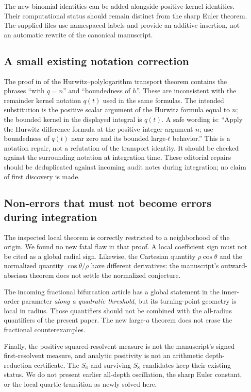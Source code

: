 \documentclass[11pt,letterpaper]{article}
\numberwithin{equation}{section}
\theoremstyle{definition}
\theoremstyle{remark}
\begin{document}
The new binomial identities can be added alongside positive-kernel
identities. Their computational status should remain distinct from
the sharp Euler theorem. The supplied  files use
namespaced labels and provide an additive insertion, not an automatic
rewrite of the canonical manuscript.

\subsection{A small existing notation correction}
The proof in  of the
Hurwitz--polylogarithm transport theorem contains the phrases ``with $q=n$'' and
``boundedness of $h$''. These are inconsistent with the remainder kernel
notation $q(t)$ used in the same formulas. The intended substitution
is the positive scalar argument of the Hurwitz formula equal to $n$;
the bounded kernel in the displayed integral is $q(t)$.
A safe wording is: ``Apply the Hurwitz difference formula at the
positive integer argument $n$; use boundedness of $q(t)$ near zero and
its bounded large-$t$ behavior.'' This is a notation repair, not a
refutation of the transport identity. It should be checked against the
surrounding notation at integration time. These editorial repairs should be deduplicated against incoming audit
notes during integration; no claim of first discovery is made.

\subsection{Non-errors that must not become errors during integration}
The inspected local theorem is correctly restricted to a neighborhood
of the origin. We found no new fatal flaw in that proof. A local
coefficient sign must not be cited as a global radial sign. Likewise,
the Cartesian quantity $\rho\cos\theta$ and the normalized quantity
$\cos\theta/\rho$ have different derivatives: the manuscript's
outward-abscissa theorem does not settle the normalized conjecture.

The incoming fractional bifurcation article has a global statement in
the inner-order parameter \emph{along a quadratic threshold}, but its
turning-point geometry is local in radius. Those quantifiers should
not be combined with the all-radius quantifiers of the present paper.
The new large-$a$ theorem does not erase the fractional counterexamples.

Finally, the positive squared-resolvent measure is not the manuscript's
signed first-resolvent measure, and analytic positivity is not an
arithmetic depth-reduction certificate. The $S_6$ and surviving $S_8$
candidates keep their existing status. We do not present earlier
all-depth oscillation, the sharp Euler constant, or the local quartic
transition as newly solved here.
\end{document}
